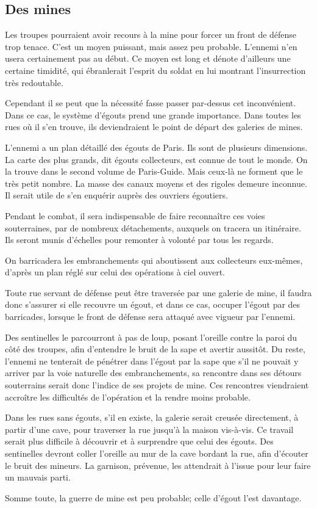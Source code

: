\documentclass[french,twoside]{book} %
\begin{document}
\subsection[Des mines]{Des mines}
\noindent Les troupes pourraient avoir recours à la mine pour forcer un front de défense trop tenace. C'est un moyen puissant, mais assez peu probable. L'ennemi n’en usera certainement pas au début. Ce moyen est long et dénote d’ailleurs une certaine timidité, qui ébranlerait l’esprit du soldat en lui montrant l’insurrection très redoutable.\par
Cependant il se peut que la nécessité fasse passer par-dessus cet inconvénient. Dans ce cas, le système d’égouts prend une grande importance. Dans toutes les rues où il s’en trouve, ils deviendraient le point de départ des galeries de mines.\par
L'ennemi a un plan détaillé des égouts de Paris. Ils sont de plusieurs dimensions. La carte des plus grands, dit égouts collecteurs, est connue de tout le monde. On la trouve dans le second volume de Paris-Guide. Mais ceux-là ne forment que le très petit nombre. La masse des canaux moyens et des rigoles demeure inconnue. Il serait utile de s’en enquérir auprès des ouvriers égoutiers.\par
Pendant le combat, il sera indispensable de faire reconnaître ces voies souterraines, par de nombreux détachements, auxquels on tracera un itinéraire. Ils seront munis d’échelles pour remonter à volonté par tous les regards.\par
On barricadera les embranchements qui aboutissent aux collecteurs eux-mêmes, d’après un plan réglé sur celui des opérations à ciel ouvert.\par
Toute rue servant de défense peut être traversée par une galerie de mine, il faudra donc s’assurer si elle recouvre un égout, et dans ce cas, occuper l’égout par des barricades, lorsque le front de défense sera attaqué avec vigueur par l’ennemi.\par
Des sentinelles le parcourront à pas de loup, posant l’oreille contre la paroi du côté des troupes, afin d’entendre le bruit de la sape et avertir aussitôt. Du reste, l’ennemi ne tenterait de pénétrer dans l’égout par la sape que s’il ne pouvait y arriver par la voie naturelle des embranchements, sa rencontre dans ses détours souterrains serait donc l’indice de ses projets de mine. Ces rencontres viendraient accroître les difficultés de l’opération et la rendre moins probable.\par
Dans les rues sans égouts, s’il en existe, la galerie serait creusée directement, à partir d’une cave, pour traverser la rue jusqu’à la maison vis-à-vis. Ce travail serait plus difficile à découvrir et à surprendre que celui des égouts. Des sentinelles devront coller l’oreille au mur de la cave bordant la rue, afin d’écouter le bruit des mineurs. La garnison, prévenue, les attendrait à l’issue pour leur faire un mauvais parti.\par
Somme toute, la guerre de mine est peu probable; celle d’égout l’est davantage.
\end{document}

